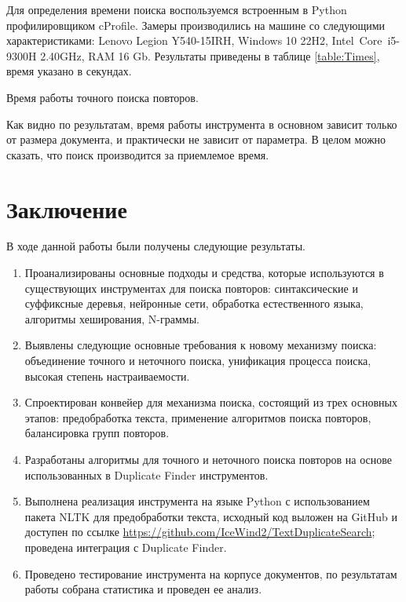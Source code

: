 \documentclass[14pt]{matmex-diploma-custom}
\begin{document}
Для определения времени поиска воспользуемся встроенным в Python профилировщиком cProfile. Замеры производились на машине со следующими характеристиками: Lenovo Legion Y540-15IRH, Windows 10 22H2, Intel\textregistered\ Core\texttrademark\ i5-9300H 2.40GHz, RAM 16 Gb. Результаты приведены в таблице \ref{table:Times}, время указано в секундах.

\begin{table}[ht!]
	\centering
	
	\caption{Время работы точного поиска повторов.}
	\label{table:Times}
\end{table}

Как видно по результатам, время работы инструмента в основном зависит только от размера документа, и практически не зависит от параметра. В целом можно сказать, что поиск производится за приемлемое время.

\clearpage
\section*{Заключение}
В ходе данной работы были получены следующие результаты.
\begin{enumerate}
   	\item Проанализированы основные подходы и средства, которые используются в существующих инструментах для поиска повторов: синтаксические и суффиксные деревья, нейронные сети, обработка естественного языка, алгоритмы хеширования, N-граммы.
   	\item Выявлены следующие основные требования к новому механизму поиска: объединение точного и неточного поиска, унификация процесса поиска, высокая степень настраиваемости.
   	\item Спроектирован конвейер для механизма поиска, состоящий из трех основных этапов: предобработка текста, применение алгоритмов поиска повторов, балансировка групп повторов.
   	\item Разработаны алгоритмы для точного и неточного поиска повторов на основе использованных в Duplicate Finder инструментов.
   	\item Выполнена реализация инструмента на языке Python с использованием пакета NLTK для предобработки текста, исходный код выложен на GitHub и доступен по ссылке \url{https://github.com/IceWind2/TextDuplicateSearch}; проведена интеграция с Duplicate Finder.
   	\item Проведено тестирование инструмента на корпусе документов, по результатам работы собрана статистика и проведен ее анализ.
\end{enumerate}


\setmonofont[Mapping=tex-text]{CMU Typewriter Text}


\end{document}
